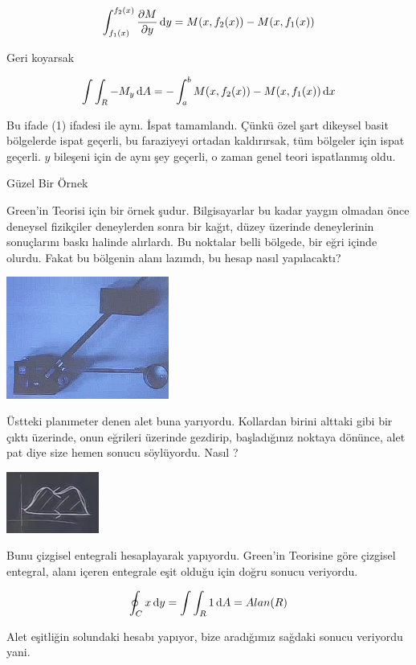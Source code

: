 \documentclass[12pt,fleqn]{article}\usepackage{../../common}
\begin{document}
$$ \int_{f_1(x)}^{f_2(x)} \frac{\partial M}{\partial y} \,\mathrm{d} y =
M(x,f_2(x)) - M(x,f_1(x))
 $$

Geri koyarsak

$$
\int \int_R -M_y \,\mathrm{d} A
= - \int_a^b M(x,f_2(x)) - M(x,f_1(x)) \,\mathrm{d} x
$$

Bu ifade (1) ifadesi ile aynı. İspat tamamlandı. Çünkü özel şart dikeysel
basit bölgelerde ispat geçerli, bu faraziyeyi ortadan kaldırırsak, tüm
bölgeler için ispat geçerli. $y$ bileşeni için de aynı şey geçerli, o zaman
genel teori ispatlanmış oldu.

Güzel Bir Örnek 

Green'in Teorisi için bir örnek şudur. Bilgisayarlar bu kadar yaygın olmadan
önce deneysel fizikçiler deneylerden sonra bir kağıt, düzey üzerinde
deneylerinin sonuçlarını baskı halinde alırlardı. Bu noktalar belli
bölgede, bir eğri içinde olurdu. Fakat bu bölgenin alanı lazımdı, bu hesap
nasıl yapılacaktı?

\begin{center}
\includegraphics[height=4cm]{22_9.png}
\end{center}

Üstteki planımeter denen alet buna yarıyordu. Kollardan birini alttaki gibi
bir çıktı üzerinde, onun eğrileri üzerinde gezdirip, başladığınız noktaya
dönünce, alet pat diye size hemen sonucu söylüyordu. Nasıl ?

\begin{center}
\includegraphics[height=2cm]{22_10.png}
\end{center}

Bunu çizgisel entegrali hesaplayarak yapıyordu. Green'in Teorisine göre
çizgisel entegral, alanı içeren entegrale eşit olduğu için doğru sonucu
veriyordu.

$$ \oint_C x \,\mathrm{d} y  = \int \int_R 1 \,\mathrm{d} A = Alan(R) $$

Alet eşitliğin solundaki hesabı yapıyor, bize aradığımız sağdaki sonucu
veriyordu yani. 
\end{document}
